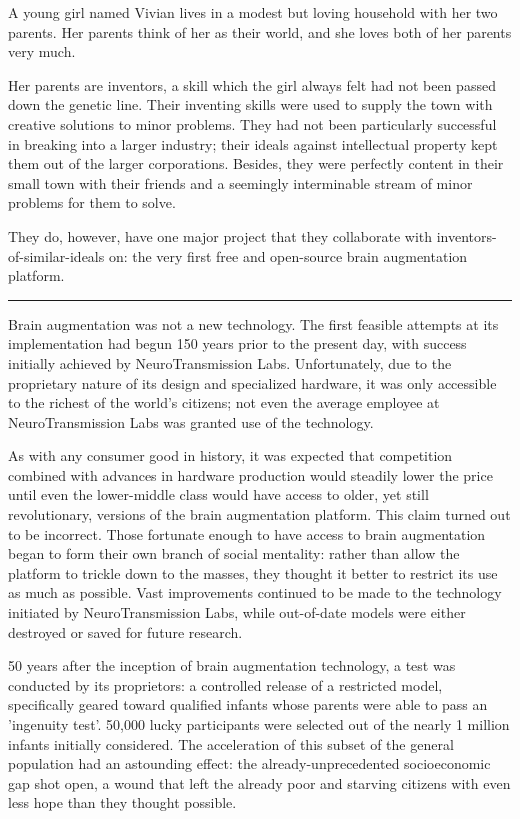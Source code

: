 \documentclass[12pt,titlepage]{article}
\newcommand\sep{\rule{2.5in}{0.1mm}}
\begin{document}
A young girl named Vivian lives in a modest but loving household with her two
parents. Her parents think of her as their world, and she loves both of her
parents very much.

Her parents are inventors, a skill which the girl always felt had not been
passed down the genetic line. Their inventing skills were used to supply the
town with creative solutions to minor problems. They had not been particularly
successful in breaking into a larger industry; their ideals against intellectual
property kept them out of the larger corporations. Besides, they were perfectly
content in their small town with their friends and a seemingly interminable
stream of minor problems for them to solve.

They do, however, have one major project that they collaborate with
inventors-of-similar-ideals on: the very first free and open-source brain
augmentation platform.

\sep

Brain augmentation was not a new technology. The first feasible attempts at its
implementation had begun 150 years prior to the present day, with success
initially achieved by NeuroTransmission Labs. Unfortunately, due to the
proprietary nature of its design and specialized hardware, it was only
accessible to the richest of the world's citizens; not even the average employee
at NeuroTransmission Labs was granted use of the technology.

As with any consumer good in history, it was expected that competition combined
with advances in hardware production would steadily lower the price until even
the lower-middle class would have access to older, yet still revolutionary,
versions of the brain augmentation platform. This claim turned out to be
incorrect. Those fortunate enough to have access to brain augmentation began to
form their own branch of social mentality: rather than allow the platform to
trickle down to the masses, they thought it better to restrict its use as much
as possible. Vast improvements continued to be made to the technology initiated
by NeuroTransmission Labs, while out-of-date models were either destroyed or
saved for future research.

50 years after the inception of brain augmentation technology, a test was
conducted by its proprietors: a controlled release of a restricted model,
specifically geared toward qualified infants whose parents were able to pass an
'ingenuity test'. 50,000 lucky participants were selected out of the nearly 1
million infants initially considered. The acceleration of this subset of the
general population had an astounding effect: the already-unprecedented
socioeconomic gap shot open, a wound that left the already poor and starving
citizens with even less hope than they thought possible.
\end{document}
